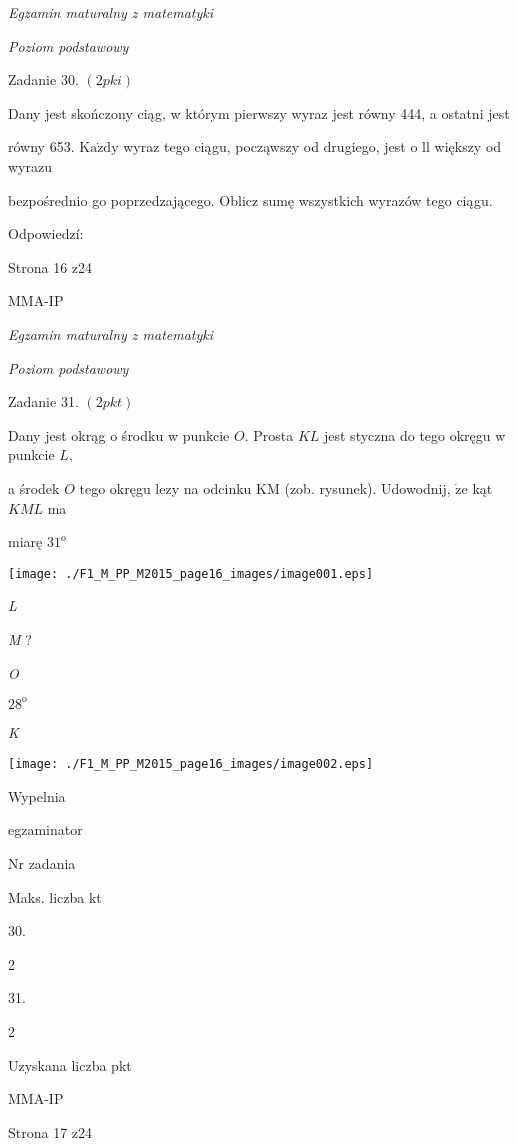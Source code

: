 \documentclass[a4paper,12pt]{article}
\begin{document}
{\it Egzamin maturalny z matematyki}

{\it Poziom podstawowy}

Zadanie 30. $(2pki)$

Dany jest skończony ciąg, w którym pierwszy wyraz jest równy 444, a ostatni jest

równy 653. $\mathrm{K}\mathrm{a}\dot{\mathrm{z}}\mathrm{d}\mathrm{y}$ wyraz tego ciągu, począwszy od drugiego, jest o ll większy od wyrazu

bezpośrednio go poprzedzającego. Oblicz sumę wszystkich wyrazów tego ciągu.

Odpowiedzí:

Strona 16 z24

MMA-IP





{\it Egzamin maturalny z matematyki}

{\it Poziom podstawowy}

Zadanie 31. $(2pkt)$

Dany jest okrąg o środku w punkcie $O$. Prosta $KL$ jest styczna do tego okręgu w punkcie $L,$

a środek $O$ tego okręgu lezy na odcinku KM (zob. rysunek). Udowodnij, $\dot{\mathrm{z}}\mathrm{e}$ kąt $KML$ ma

miarę $31^{\mathrm{o}}$
\begin{center}
\texttt{[image: ./F1\_M\_PP\_M2015\_page16\_images/image001.eps]}
\end{center}
{\it L}

{\it M} ?

{\it O}

$28^{\mathrm{o}}$

{\it K}
\begin{center}
\texttt{[image: ./F1\_M\_PP\_M2015\_page16\_images/image002.eps]}
\end{center}
Wypelnia

egzaminator

Nr zadania

Maks. liczba kt

30.

2

31.

2

Uzyskana liczba pkt

MMA-IP

Strona 17 z24
\end{document}
